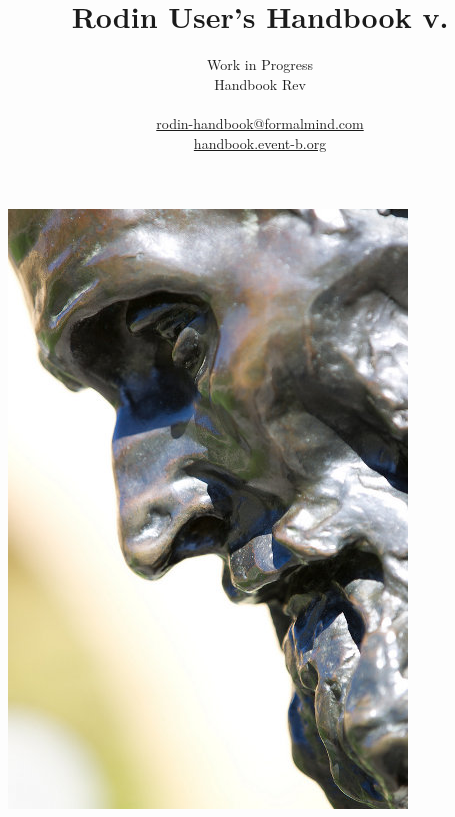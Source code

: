 \documentclass[12pt]{book}
\title{Rodin User's Handbook v.\versionnr}
\author{
Work in Progress\\
Handbook $ $Rev$ $ \\
\\
\href{mailto:rodin-handbook@formalmind.com}{rodin-handbook@formalmind.com}\\
\href{http://handbook.event-b.org}{handbook.event-b.org}
}
\begin{document}
        

\ifplastex
\maketitle
\begin{center}
\includegraphics{img/rodin_miikka_skaffari_small.jpg}
\end{center}
\else
\end{document}
